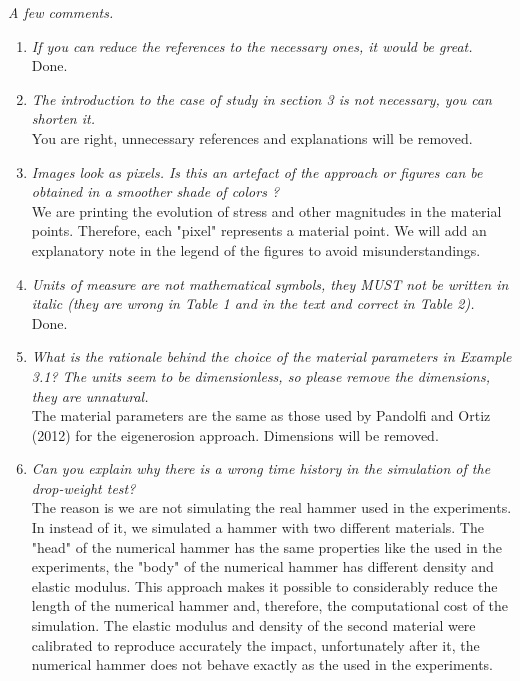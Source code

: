 \documentclass[12pt]{article}
\begin{document}
\textit{A few comments.}
 \begin{enumerate}
 
\item \textit{If you can reduce the references to the necessary ones, it would be great.}\\

Done.

\item \textit{The introduction to the case of study in section 3 is not necessary, you can shorten it.}\\

You are right, unnecessary references  and explanations will be removed. 

\item \textit{Images look as pixels. Is this an artefact of the approach or figures can be obtained in a smoother shade of colors ?}\\

We are printing the evolution of stress and other magnitudes in the material points. Therefore, each "pixel" represents a material point. We will add an explanatory note in the legend of the figures to avoid misunderstandings.

\item \textit{Units of measure are not mathematical symbols, they MUST not be written in italic (they are wrong in Table 1 and in the text and correct in Table 2).}\\

Done.

\item \textit{What is the rationale behind the choice of the material parameters in Example 3.1? The units seem to be dimensionless, so please remove the dimensions, they are unnatural.}\\

The material parameters are the same as those used by Pandolfi and Ortiz (2012) \cite{Ortiz_Pandolfi_2012} for the eigenerosion approach. Dimensions will be removed.

\item \textit{Can you explain why there is a wrong time history in the simulation of the drop-weight test?
}\\

The reason is we are not simulating the real hammer used in the experiments. In instead of it, we simulated a hammer with two different materials. The "head" of the numerical hammer has the same properties like the used in the experiments, the "body" of the numerical hammer has different density and elastic modulus. This approach makes it possible to considerably reduce the length of the numerical hammer and, therefore, the computational cost of the simulation. The elastic modulus and density of the second material were calibrated to reproduce accurately the impact, unfortunately after it, the numerical hammer does not behave exactly as the used in the experiments. 

\end{enumerate}
\end{document}
